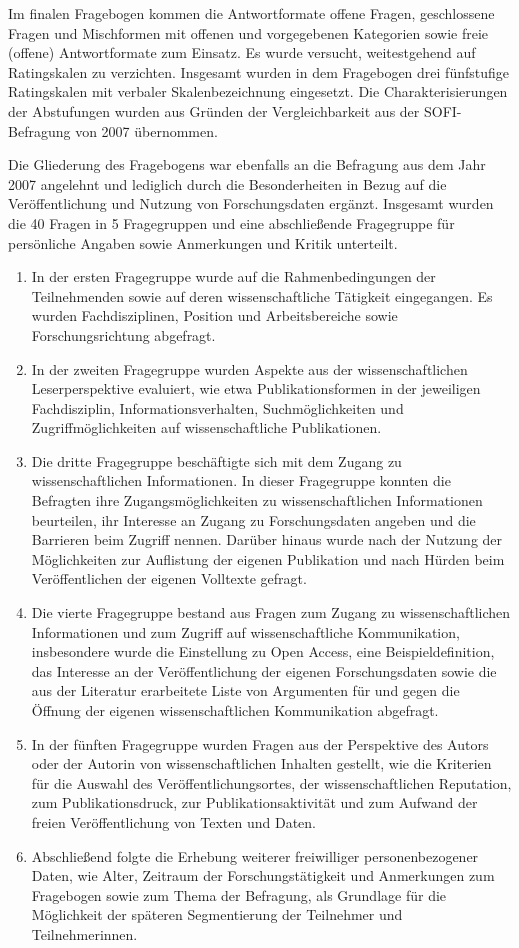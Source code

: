 Im finalen Fragebogen kommen die Antwortformate offene Fragen, geschlossene Fragen und Mischformen mit offenen und vorgegebenen Kategorien sowie freie (offene) Antwortformate zum Einsatz. Es wurde versucht, weitestgehend auf Ratingskalen zu verzichten. Insgesamt wurden in dem Fragebogen drei fünfstufige Ratingskalen mit verbaler Skalenbezeichnung eingesetzt. Die Charakterisierungen der Abstufungen wurden aus Gründen der Vergleichbarkeit aus der SOFI-Befragung von 2007 übernommen.

Die Gliederung des Fragebogens war ebenfalls an die Befragung aus dem Jahr 2007 angelehnt und lediglich durch die Besonderheiten in Bezug auf die Veröffentlichung und Nutzung von Forschungsdaten ergänzt. Insgesamt wurden die 40 Fragen in 5 Fragegruppen und eine abschließende Fragegruppe für persönliche Angaben sowie Anmerkungen und Kritik unterteilt.

\begin{enumerate}
\item In der ersten Fragegruppe wurde auf die Rahmenbedingungen der Teilnehmenden sowie auf deren wissenschaftliche Tätigkeit eingegangen. Es wurden Fachdisziplinen, Position und Arbeitsbereiche sowie Forschungsrichtung abgefragt.
\item In der zweiten Fragegruppe wurden Aspekte aus der wissenschaftlichen Leserperspektive evaluiert, wie etwa Publikationsformen in der jeweiligen Fachdisziplin, Informationsverhalten, Suchmöglichkeiten und Zugriffmöglichkeiten auf wissenschaftliche Publikationen.
\item Die dritte Fragegruppe beschäftigte sich mit dem Zugang zu wissenschaftlichen Informationen. In dieser Fragegruppe konnten die Befragten ihre Zugangsmöglichkeiten zu wissenschaftlichen Informationen beurteilen, ihr Interesse an Zugang zu Forschungsdaten angeben und die Barrieren beim Zugriff nennen. Darüber hinaus wurde nach der Nutzung der Möglichkeiten zur Auflistung der eigenen Publikation und nach Hürden beim Veröffentlichen der eigenen Volltexte gefragt.
\item Die vierte Fragegruppe bestand aus Fragen zum Zugang zu wissenschaftlichen Informationen und zum Zugriff auf wissenschaftliche Kommunikation, insbesondere wurde die Einstellung zu Open Access, eine Beispieldefinition, das Interesse an der Veröffentlichung der eigenen Forschungsdaten sowie die aus der Literatur erarbeitete Liste von Argumenten für und gegen die Öffnung der eigenen wissenschaftlichen Kommunikation abgefragt.
\item In der fünften Fragegruppe wurden Fragen aus der Perspektive des Autors oder der Autorin von wissenschaftlichen Inhalten gestellt, wie die Kriterien für die Auswahl des Veröffentlichungsortes, der wissenschaftlichen Reputation, zum Publikationsdruck, zur Publikationsaktivität und zum Aufwand der freien Veröffentlichung von Texten und Daten.
\item Abschließend folgte die Erhebung weiterer freiwilliger personenbezogener Daten, wie Alter, Zeitraum der Forschungstätigkeit und Anmerkungen zum Fragebogen sowie zum Thema der Befragung, als Grundlage für die Möglichkeit der späteren Segmentierung der Teilnehmer und Teilnehmerinnen.
\end{enumerate}

